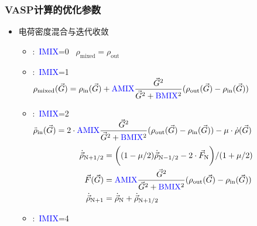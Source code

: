 \documentclass[cjk,slidestop,handout,compress,mathserif,blue]{beamer}	%
\begin{document}
\frame
{
	\frametitle{\textrm{VASP}计算的优化参数}
	\begin{itemize}
		\item 电荷密度混合与迭代收敛
			\begin{itemize} 
		   \item {}:~\textcolor{blue}{IMIX}=0~ $\rho_{\mathrm{mixed}}=\rho_{\mathrm{out}}$
		   \item {}:~\textcolor{blue}{IMIX}=1\\
			   $\rho_{\mathrm{mixed}}(\vec G)=\rho_{\mathrm{in}}(\vec G)+\textcolor{blue}{\mathrm{AMIX}}\dfrac{\vec G^2}{\vec G^2+\textcolor{blue}{\mathrm{BMIX}}^2}(\rho_{\mathrm{out}}(\vec G)-\rho_{\mathrm{in}}(\vec G))$ 
		   \item {}:~\textcolor{blue}{IMIX}=2\\
			   $\ddot{\rho}_{\mathrm{in}}(\vec G)=2\cdot\textcolor{blue}{\mathrm{AMIX}}\dfrac{\vec G^2}{\vec G^2+\textcolor{blue}{\mathrm{BMIX}}^2}(\rho_{\mathrm{out}}(\vec G)-\rho_{\mathrm{in}}(\vec G))-\mu\cdot\dot{\rho}(\vec G)$
			\begin{displaymath}
				\begin{aligned}
					\dot{\vec\rho}_{\mathrm{N+1/2}}&=\bigg((1-\mu/2)\dot{\vec\rho}_{\mathrm{N}-1/2}-2\cdot\vec F_{\mathrm{N}}\bigg)/(1+\mu/2)\\
					\vec F(\vec G)&=\textcolor{blue}{\mathrm{AMIX}}\dfrac{\vec G^2}{\vec G^2+\textcolor{blue}{\mathrm{BMIX}}^2}(\rho_{\mathrm{out}}(\vec G)-\rho_{\mathrm{in}}(\vec G))\\
					\dot{\vec\rho}_{\mathrm{N+1}}&=\dot{\vec\rho}_{\mathrm{N}}+\dot{\vec\rho}_{\mathrm{N}+1/2}
				\end{aligned}
			\end{displaymath}
		   \item {}:~\textcolor{blue}{IMIX}=4\\
			\end{itemize}
	\end{itemize}
}
\end{document}
